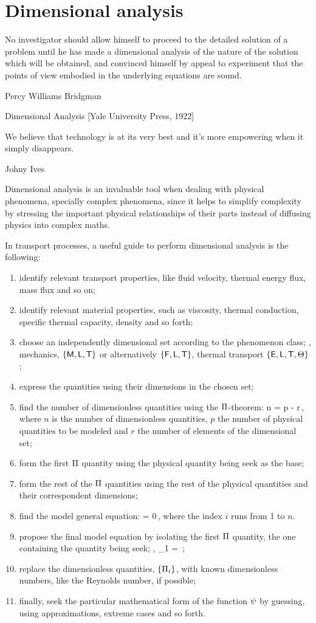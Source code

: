 \section{Dimensional analysis}
%
\epigraph{No investigator should allow himself to proceed to the detailed solution of a problem until he has made a dimensional analysis of the nature of the solution which will be obtained, and convinced himself by appeal to experiment that the points of view embodied in the underlying equations are sound.}
{Percy Williams Bridgman}{Dimensional Analysis [Yale University Press, 1922]}
%
\epigraph{We believe that technology is at its very best and it's more empowering when it simply disappears.}
{Johny Ives}{}
%
Dimensional analysis is an invaluable tool when dealing with physical phenomena, specially complex phenomena, since it helps to simplify complexity by stressing the important physical relationships of their parts instead of diffusing physics into complex maths.

In transport processes, a useful guide to perform dimensional analysis is the following:
\begin{enumerate}
\item identify relevant transport properties, like fluid velocity, thermal energy flux, mass flux and so on;
%
\item identify relevant material properties, such as viscosity, thermal conduction, specific thermal capacity, density and so forth;
%
\item choose an independently dimensional set according to the phenomenon class; \ie, mechanics, $\left\lbrace{\mathsf{M}, \mathsf{L}, \mathsf{T}}\right\rbrace$ or alternatively $\left\lbrace{\mathsf{F}, \mathsf{L}, \mathsf{T}}\right\rbrace$, thermal transport $\left\lbrace{\mathsf{E}, \mathsf{L}, \mathsf{T}, \Theta}\right\rbrace$;
%
\item express the quantities using their dimensions in the chosen set;
%
\item find the number of dimensionless quantities using the $\Pi$-theorem:
\beq
n = p - r\,,
\eeq
where $n$ is the number of dimensionless quantities, $p$ the number of physical quantities to be modeled and $r$ the number of elements of the dimensional set;
%
\item form the first $\Pi$ quantity using the physical quantity being seek as the base;
%
\item form the rest of the $\Pi$ quantities using the rest of the physical quantities and their correspondent dimensions;
%
\item find the model general equation:
\beq
\dimfunc{} = 0\,,
\eeq
where the index $i$ runs from 1 to $n$.
%
\item propose the final model equation by isolating the first $\Pi$ quantity, the one containing the quantity being seek; \ie,
\beq
\kdim_1 = \dimfunc{}\,;
\eeq
%
\item replace the dimensionless quantities, $\left\lbrace{\Pi_i}\right\rbrace$, with known dimensionless numbers, like the Reynolds number, if possible;
%
\item finally, seek the particular mathematical form of the function $\psi$ by guessing, using approximations, extreme cases and so forth.
\end{enumerate}

